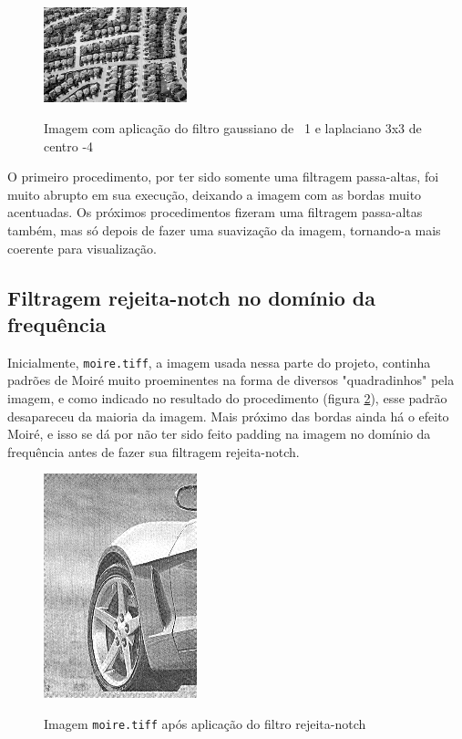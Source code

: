 \documentclass[conference]{IEEEtran}
\begin{document}
\begin{figure}
    \centering
    \includegraphics[width=0.37\textwidth]{imgs/Q2-7 Gauss LaPlace added (3x3 sigma 1 k 3x3 c-4).png}
    \caption\scriptsize{Imagem com aplicação do filtro gaussiano de \textsigma\ 1 e laplaciano 3x3 de centro -4}
    \label{fig:q2_r_gauss1}
\end{figure}

O primeiro procedimento, por ter sido somente uma filtragem passa-altas, foi muito abrupto em sua execução, deixando a imagem com as bordas muito acentuadas. Os próximos procedimentos fizeram uma filtragem passa-altas também, mas só depois de fazer uma suavização da imagem, tornando-a mais coerente para visualização.


\subsection{Filtragem rejeita-notch no domínio da frequência}

Inicialmente, \texttt{moire.tiff}, a imagem usada nessa parte do projeto, continha padrões de Moiré muito proeminentes na forma de diversos "quadradinhos" pela imagem, e como indicado no resultado do procedimento (figura \ref{fig:q3_r_car}), esse padrão desapareceu da maioria da imagem. Mais próximo das bordas ainda há o efeito Moiré, e isso se dá por não ter sido feito padding na imagem no domínio da frequência antes de fazer sua filtragem rejeita-notch.

\begin{figure}
    \centering
    \includegraphics[]{imgs/Q3-4 Reject Notch result.png}
    \caption\scriptsize{Imagem \texttt{moire.tiff} após aplicação do filtro rejeita-notch}
    \label{fig:q3_r_car}
\end{figure}
\end{document}
